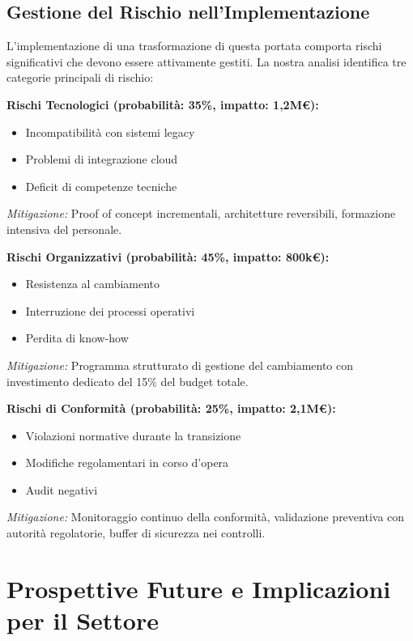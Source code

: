 \subsection{\texorpdfstring{\textbf{Gestione del Rischio nell'Implementazione}}{5.4.2 - Gestione del Rischio nell'Implementazione}}
\label{subsec:5.4.2}

L'implementazione di una trasformazione di questa portata comporta rischi significativi che devono essere attivamente gestiti. La nostra analisi identifica tre categorie principali di rischio:

\textbf{Rischi Tecnologici (probabilità: 35\%, impatto: 1,2M€):}
\begin{itemize}
\item Incompatibilità con sistemi legacy
\item Problemi di integrazione cloud
\item Deficit di competenze tecniche
\end{itemize}

\textit{Mitigazione:} Proof of concept incrementali, architetture reversibili, formazione intensiva del personale.

\textbf{Rischi Organizzativi (probabilità: 45\%, impatto: 800k€):}
\begin{itemize}
\item Resistenza al cambiamento
\item Interruzione dei processi operativi
\item Perdita di know-how
\end{itemize}

\textit{Mitigazione:} Programma strutturato di gestione del cambiamento con investimento dedicato del 15\% del budget totale.

\textbf{Rischi di Conformità (probabilità: 25\%, impatto: 2,1M€):}
\begin{itemize}
\item Violazioni normative durante la transizione
\item Modifiche regolamentari in corso d'opera
\item Audit negativi
\end{itemize}

\textit{Mitigazione:} Monitoraggio continuo della conformità, validazione preventiva con autorità regolatorie, buffer di sicurezza nei controlli.

\section{\texorpdfstring{\textbf{Prospettive Future e Implicazioni per il Settore}}{5.5 - Prospettive Future e Implicazioni per il Settore}}
\label{sec:5.5}

